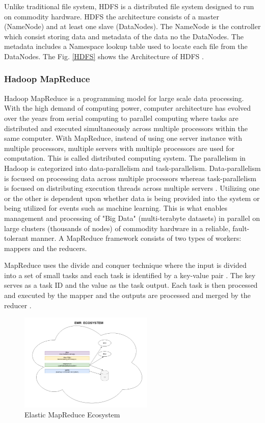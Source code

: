 \documentclass[journal]{IEEEtran}
\begin{document}
Unlike traditional file system, HDFS is a distributed file system designed to run on commodity hardware. 
HDFS the architecture consists of a master (NameNode) and at least one slave (DataNodes)\cite{HDFSarchitecture}.
The NameNode is the controller which consist storing data and metadata of the data no the DataNodes.
 The metadata includes a Namespace lookup table used to locate each file from the DataNodes. 
The Fig. \ref{HDFS} shows the Architecture of HDFS \cite{HDFS}.

\subsubsection{Hadoop MapReduce}

Hadoop MapReduce is a programming model for large scale data processing. 
With the high demand of computing power,
 computer architecture has evolved over the years from serial computing to parallel computing
 where tasks are distributed and executed simultaneously across multiple processors within the same computer. 
With MapReduce,
 instead of using one server instance with multiple processors, 
 multiple servers with multiple processors are used for computation.
This is called distributed computing system. 
The parallelism in Hadoop is categorized into data-parallelism and task-parallelism.
Data-parallelism is focused on processing data across multiple processors whereas
 task-parallelism is focused on distributing execution threads across multiple servers \cite{Parallelism}. 
Utilizing one or the other is dependent upon whether data is being provided into
 the system or being utilized for events such as machine learning. 
This is what enables management and processing of "Big Data" (multi-terabyte datasets)
 in parallel on large clusters (thousands of nodes) of commodity hardware in a reliable,
 fault-tolerant manner. 
A MapReduce framework consists of two types of workers: mappers and the reducers.

MapReduce uses the divide and conquer technique where the input is divided into a set
 of small tasks and each task is identified by a key-value pair \cite{Divide-and-Conquer}.
The key serves as a task ID and the value as the task output.
Each task is then processed and executed by the mapper and
the outputs are processed and merged by the reducer \cite{MapReduce}.

\begin{figure}
    \centering
    \includegraphics[width=2.5in]{EMR_Ecosystem.png}
    \caption{Elastic MapReduce Ecosystem}
    \label{EMR}
\end{figure}
\end{document}

